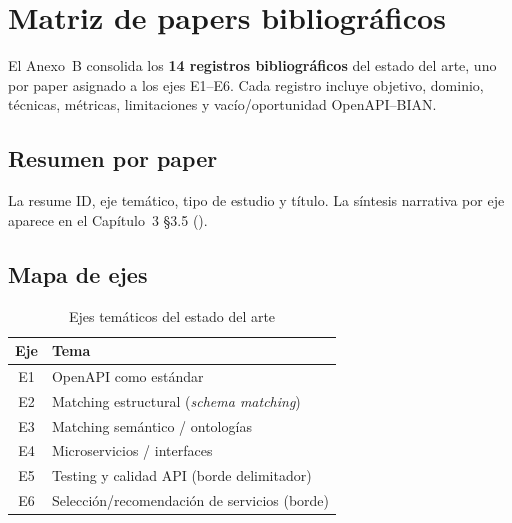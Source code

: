 \chapter{Matriz de papers bibliográficos}
\label{anexo:b}

El Anexo~B consolida los \textbf{14 registros bibliográficos} del estado del arte, uno por paper
asignado a los ejes E1--E6. Cada registro incluye objetivo, dominio, técnicas, métricas,
limitaciones y vacío/oportunidad OpenAPI--BIAN.

\section{Resumen por paper}

La  resume ID, eje temático, tipo de estudio y título. La síntesis narrativa
por eje aparece en el Capítulo~3 §3.5 ().

\small

\normalsize

\section{Mapa de ejes}

\begin{table}[H]
  \centering
  \caption{Ejes temáticos del estado del arte}
  \label{tab:anexo-b-ejes}
  \small
  \begin{tabular}{@{}cl@{}}
    \toprule
    \textbf{Eje} & \textbf{Tema} \\
    \midrule
    E1 & OpenAPI como estándar \\
    E2 & Matching estructural (\textit{schema matching}) \\
    E3 & Matching semántico / ontologías \\
    E4 & Microservicios / interfaces \\
    E5 & Testing y calidad API (borde delimitador) \\
    E6 & Selección/recomendación de servicios (borde) \\
    \bottomrule
  \end{tabular}
\end{table}
